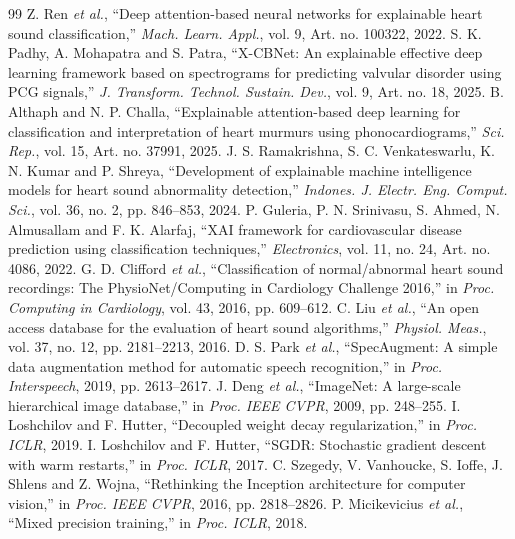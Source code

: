 \documentclass[conference]{IEEEtran}
\begin{document}
\begin{thebibliography}{99}
 Z. Ren \textit{et al.}, ``Deep attention-based neural networks for explainable heart sound classification,'' \textit{Mach. Learn. Appl.}, vol. 9, Art. no. 100322, 2022.
 S. K. Padhy, A. Mohapatra and S. Patra, ``X-CBNet: An explainable effective deep learning framework based on spectrograms for predicting valvular disorder using PCG signals,'' \textit{J. Transform. Technol. Sustain. Dev.}, vol. 9, Art. no. 18, 2025.
 B. Althaph and N. P. Challa, ``Explainable attention-based deep learning for classification and interpretation of heart murmurs using phonocardiograms,'' \textit{Sci. Rep.}, vol. 15, Art. no. 37991, 2025.
 J. S. Ramakrishna, S. C. Venkateswarlu, K. N. Kumar and P. Shreya, ``Development of explainable machine intelligence models for heart sound abnormality detection,'' \textit{Indones. J. Electr. Eng. Comput. Sci.}, vol. 36, no. 2, pp. 846--853, 2024.
 P. Guleria, P. N. Srinivasu, S. Ahmed, N. Almusallam and F. K. Alarfaj, ``XAI framework for cardiovascular disease prediction using classification techniques,'' \textit{Electronics}, vol. 11, no. 24, Art. no. 4086, 2022.
 G. D. Clifford \textit{et al.}, ``Classification of normal/abnormal heart sound recordings: The PhysioNet/Computing in Cardiology Challenge 2016,'' in \textit{Proc. Computing in Cardiology}, vol. 43, 2016, pp. 609--612.
 C. Liu \textit{et al.}, ``An open access database for the evaluation of heart sound algorithms,'' \textit{Physiol. Meas.}, vol. 37, no. 12, pp. 2181--2213, 2016.
 D. S. Park \textit{et al.}, ``SpecAugment: A simple data augmentation method for automatic speech recognition,'' in \textit{Proc. Interspeech}, 2019, pp. 2613--2617.
 J. Deng \textit{et al.}, ``ImageNet: A large-scale hierarchical image database,'' in \textit{Proc. IEEE CVPR}, 2009, pp. 248--255.
 I. Loshchilov and F. Hutter, ``Decoupled weight decay regularization,'' in \textit{Proc. ICLR}, 2019.
 I. Loshchilov and F. Hutter, ``SGDR: Stochastic gradient descent with warm restarts,'' in \textit{Proc. ICLR}, 2017.
 C. Szegedy, V. Vanhoucke, S. Ioffe, J. Shlens and Z. Wojna, ``Rethinking the Inception architecture for computer vision,'' in \textit{Proc. IEEE CVPR}, 2016, pp. 2818--2826.
 P. Micikevicius \textit{et al.}, ``Mixed precision training,'' in \textit{Proc. ICLR}, 2018.
\end{thebibliography}
\end{document}
